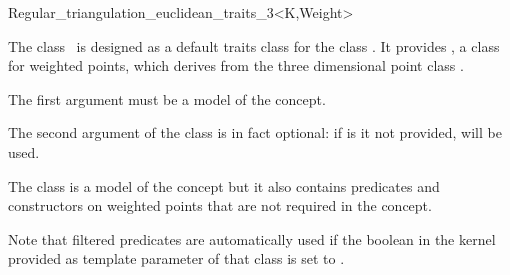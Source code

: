 

\begin{ccRefClass}{Regular_triangulation_euclidean_traits_3<K,Weight>}  %


\ccDefinition
  
The class \ccRefName\ is designed as a default traits class for the
class . 
It provides , a class for weighted points, which derives
from the three dimensional point class .

The first argument  must be a model of the  concept. 

The second argument  of the class
 is in fact
optional: if is it not provided,  will be used.

The class is a model of the concept 
but it also contains predicates and constructors on weighted points
that are not required in the
concept.

Note that filtered predicates are automatically used if the 
boolean  in the kernel provided as template parameter 
of that class is set to .


 



\ccIsModel
{}


\end{ccRefClass}
